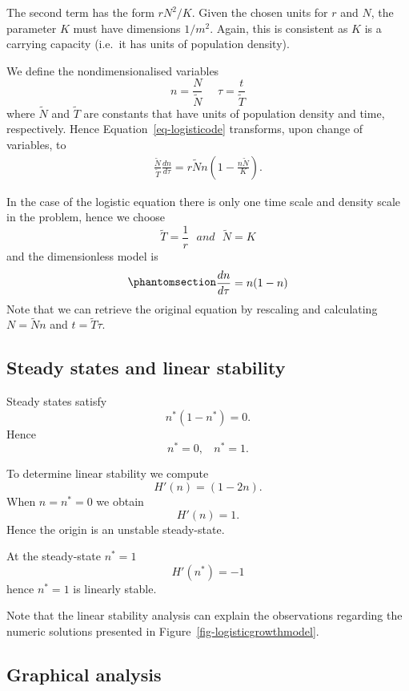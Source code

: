 \documentclass[
  letterpaper,
  DIV=11,
  numbers=noendperiod]{scrreprt}
\begin{document}
The second term has the form \(rN^2/K\). Given the chosen units for
\(r\) and \(N\), the parameter \(K\) must have dimensions \(1/m^2\).
Again, this is consistent as \(K\) is a carrying capacity (i.e.~it has
units of population density).

We define the nondimensionalised variables \[
n=\frac{N}{\tilde{N}} \ \ \ \ \ \ \tau=\frac{t}{\tilde{T}}
\] where \(\tilde{N}\) and \(\tilde{T}\) are constants that have units
of population density and time, respectively. Hence
Equation~\ref{eq-logisticode} transforms, upon change of variables, to
\[
\begin{aligned}
\frac{\tilde{N}}{\tilde{T} }\frac{dn}{d\tau}=r\tilde{N}n(1-\frac{n\tilde{N}}{K}).
\end{aligned}
\]

In the case of the logistic equation there is only one time scale and
density scale in the problem, hence we choose \[
\tilde{T}=\frac{1}{r}  \ \ \ and \ \ \ \tilde{N}=K
\] and the dimensionless model is
\begin{equation}\protect\phantomsection\label{eq-logisticnondim}{
\begin{aligned}
\frac{dn}{d\tau}= n(1-n)
\end{aligned}
}\end{equation} Note that we can retrieve the original equation by
rescaling and calculating \(N=\tilde{N}n\) and \(t=\tilde{T}\tau\).

\subsection{Steady states and linear
stability}\label{steady-states-and-linear-stability}

Steady states satisfy \[
n^*(1-n^*)=0.
\] Hence \[
n^*=0, \ \ \ \ n^*=1.
\]

To determine linear stability we compute \[
H'(n)= (1-2n).
\] When \(n=n^*=0\) we obtain \[
H'(n)= 1.
\] Hence the origin is an unstable steady-state.

At the steady-state \(n^*=1\) \[
H'(n^*)= -1
\] hence \(n^*=1\) is linearly stable.

Note that the linear stability analysis can explain the observations
regarding the numeric solutions presented in
Figure~\ref{fig-logisticgrowthmodel}.

\subsection{Graphical analysis}\label{graphical-analysis}
\end{document}
